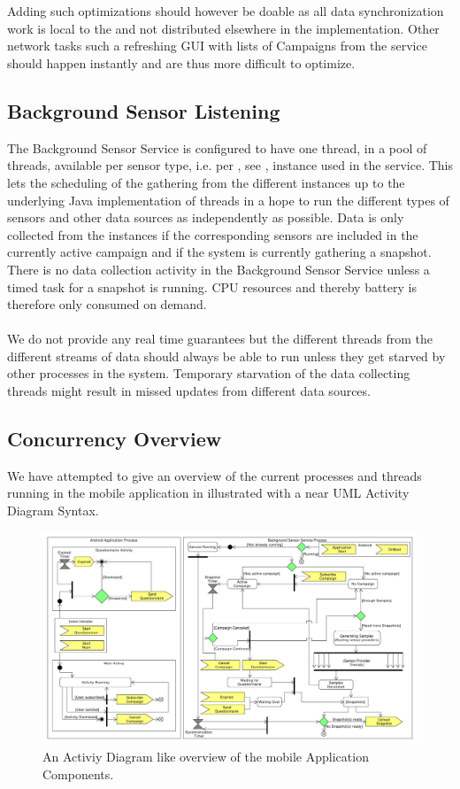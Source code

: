 \\\\
Adding such optimizations should however be doable as all data synchronization work is local to the  and not distributed elsewhere in the implementation. Other network tasks such a refreshing GUI with lists of Campaigns from the service should happen instantly and are thus more difficult to optimize. 

\subsection{Background Sensor Listening}

The Background Sensor Service is configured to have one thread, in a pool of threads, available per sensor type, i.e. per , see , instance used in the service. This lets the scheduling of the gathering from the different  instances up to the underlying Java implementation of threads in a hope to run the different types of sensors and other data sources as independently as possible. Data is only collected from the  instances if the corresponding sensors are included in the currently active campaign and if the system is currently gathering a snapshot. There is no data collection activity in the Background Sensor Service unless a timed task for a snapshot is running. CPU resources and thereby battery is therefore only consumed on demand.
\\\\
We do not provide any real time guarantees but the different threads from the different streams of data should always be able to run unless they get starved by other processes in the system. Temporary starvation of the data collecting threads might result in missed updates from different data sources. 

\subsection{Concurrency Overview}

We have attempted to give an overview of the current processes and threads running in the mobile application in  illustrated with a near UML Activity Diagram Syntax. 

\begin{figure}[!htbp]
    \centering
    \includegraphics[width=\textwidth]{graphic/backgroundsensorservice/lifecyclestuff.pdf}
    \caption{An Activiy Diagram like overview of the mobile Application Components.}
    \label{fig:system_currency_and_lifecycle}
\end{figure}
\FloatBarrier